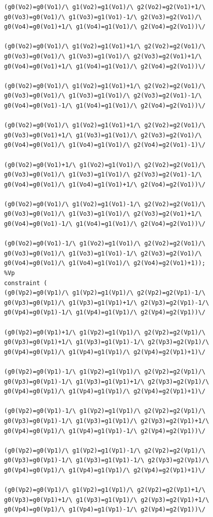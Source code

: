 \begin{appendices}
\begin{lstlisting}
(g0(Vo2)=g0(Vo1)/\ g1(Vo2)=g1(Vo1)/\ g2(Vo2)=g2(Vo1)+1/\ g0(Vo3)=g0(Vo1)/\ g1(Vo3)=g1(Vo1)-1/\ g2(Vo3)=g2(Vo1)/\ g0(Vo4)=g0(Vo1)+1/\ g1(Vo4)=g1(Vo1)/\ g2(Vo4)=g2(Vo1))\/ 

(g0(Vo2)=g0(Vo1)/\ g1(Vo2)=g1(Vo1)+1/\ g2(Vo2)=g2(Vo1)/\ g0(Vo3)=g0(Vo1)/\ g1(Vo3)=g1(Vo1)/\ g2(Vo3)=g2(Vo1)+1/\ g0(Vo4)=g0(Vo1)+1/\ g1(Vo4)=g1(Vo1)/\ g2(Vo4)=g2(Vo1))\/ 

(g0(Vo2)=g0(Vo1)/\ g1(Vo2)=g1(Vo1)+1/\ g2(Vo2)=g2(Vo1)/\ g0(Vo3)=g0(Vo1)/\ g1(Vo3)=g1(Vo1)/\ g2(Vo3)=g2(Vo1)-1/\ g0(Vo4)=g0(Vo1)-1/\ g1(Vo4)=g1(Vo1)/\ g2(Vo4)=g2(Vo1))\/ 

(g0(Vo2)=g0(Vo1)/\ g1(Vo2)=g1(Vo1)+1/\ g2(Vo2)=g2(Vo1)/\ g0(Vo3)=g0(Vo1)+1/\ g1(Vo3)=g1(Vo1)/\ g2(Vo3)=g2(Vo1)/\ g0(Vo4)=g0(Vo1)/\ g1(Vo4)=g1(Vo1)/\ g2(Vo4)=g2(Vo1)-1)\/ 

(g0(Vo2)=g0(Vo1)+1/\ g1(Vo2)=g1(Vo1)/\ g2(Vo2)=g2(Vo1)/\ g0(Vo3)=g0(Vo1)/\ g1(Vo3)=g1(Vo1)/\ g2(Vo3)=g2(Vo1)-1/\ g0(Vo4)=g0(Vo1)/\ g1(Vo4)=g1(Vo1)+1/\ g2(Vo4)=g2(Vo1))\/ 

(g0(Vo2)=g0(Vo1)/\ g1(Vo2)=g1(Vo1)-1/\ g2(Vo2)=g2(Vo1)/\ g0(Vo3)=g0(Vo1)/\ g1(Vo3)=g1(Vo1)/\ g2(Vo3)=g2(Vo1)+1/\ g0(Vo4)=g0(Vo1)-1/\ g1(Vo4)=g1(Vo1)/\ g2(Vo4)=g2(Vo1))\/ 

(g0(Vo2)=g0(Vo1)-1/\ g1(Vo2)=g1(Vo1)/\ g2(Vo2)=g2(Vo1)/\ g0(Vo3)=g0(Vo1)/\ g1(Vo3)=g1(Vo1)-1/\ g2(Vo3)=g2(Vo1)/\ g0(Vo4)=g0(Vo1)/\ g1(Vo4)=g1(Vo1)/\ g2(Vo4)=g2(Vo1)+1));
%Vp
constraint (
(g0(Vp2)=g0(Vp1)/\ g1(Vp2)=g1(Vp1)/\ g2(Vp2)=g2(Vp1)-1/\ g0(Vp3)=g0(Vp1)/\ g1(Vp3)=g1(Vp1)+1/\ g2(Vp3)=g2(Vp1)-1/\ g0(Vp4)=g0(Vp1)-1/\ g1(Vp4)=g1(Vp1)/\ g2(Vp4)=g2(Vp1))\/ 

(g0(Vp2)=g0(Vp1)+1/\ g1(Vp2)=g1(Vp1)/\ g2(Vp2)=g2(Vp1)/\ g0(Vp3)=g0(Vp1)+1/\ g1(Vp3)=g1(Vp1)-1/\ g2(Vp3)=g2(Vp1)/\ g0(Vp4)=g0(Vp1)/\ g1(Vp4)=g1(Vp1)/\ g2(Vp4)=g2(Vp1)+1)\/ 

(g0(Vp2)=g0(Vp1)-1/\ g1(Vp2)=g1(Vp1)/\ g2(Vp2)=g2(Vp1)/\ g0(Vp3)=g0(Vp1)-1/\ g1(Vp3)=g1(Vp1)+1/\ g2(Vp3)=g2(Vp1)/\ g0(Vp4)=g0(Vp1)/\ g1(Vp4)=g1(Vp1)/\ g2(Vp4)=g2(Vp1)+1)\/ 

(g0(Vp2)=g0(Vp1)-1/\ g1(Vp2)=g1(Vp1)/\ g2(Vp2)=g2(Vp1)/\ g0(Vp3)=g0(Vp1)-1/\ g1(Vp3)=g1(Vp1)/\ g2(Vp3)=g2(Vp1)+1/\ g0(Vp4)=g0(Vp1)/\ g1(Vp4)=g1(Vp1)-1/\ g2(Vp4)=g2(Vp1))\/ 

(g0(Vp2)=g0(Vp1)/\ g1(Vp2)=g1(Vp1)-1/\ g2(Vp2)=g2(Vp1)/\ g0(Vp3)=g0(Vp1)-1/\ g1(Vp3)=g1(Vp1)-1/\ g2(Vp3)=g2(Vp1)/\ g0(Vp4)=g0(Vp1)/\ g1(Vp4)=g1(Vp1)/\ g2(Vp4)=g2(Vp1)+1)\/ 

(g0(Vp2)=g0(Vp1)/\ g1(Vp2)=g1(Vp1)/\ g2(Vp2)=g2(Vp1)+1/\ g0(Vp3)=g0(Vp1)+1/\ g1(Vp3)=g1(Vp1)/\ g2(Vp3)=g2(Vp1)+1/\ g0(Vp4)=g0(Vp1)/\ g1(Vp4)=g1(Vp1)-1/\ g2(Vp4)=g2(Vp1))\/ 


\end{lstlisting}
\end{appendices}
